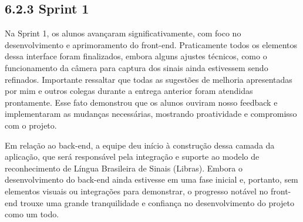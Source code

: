 \hypertarget{__RefHeading___Toc4470_311817663321}{}

\subsection*{6.2.3 Sprint 1}
\label{cliente-hoortech:text-h-0029}

\originaltab{}Na Sprint 1, os alunos avançaram significativamente, com foco no desenvolvimento e aprimoramento do front-end. Praticamente todos os elementos dessa interface foram finalizados, embora alguns ajustes técnicos, como o funcionamento da câmera para captura dos sinais ainda estivessem sendo refinados. Importante ressaltar que todas as sugestões de melhoria apresentadas por mim e outros colegas durante a entrega anterior foram atendidas prontamente. Esse fato demonstrou que os alunos ouviram nosso feedback e implementaram as mudanças necessárias, mostrando proatividade e compromisso com o projeto.\originalspace{}\par

\originaltab{}Em relação ao back-end, a equipe deu início à construção dessa camada da aplicação, que será responsável pela integração e suporte ao modelo de reconhecimento de Língua Brasileira de Sinais (Libras). Embora o desenvolvimento do back-end ainda estivesse em uma fase inicial e, portanto, sem elementos visuais ou integrações para demonstrar, o progresso notável no front-end trouxe uma grande tranquilidade e confiança no desenvolvimento do projeto como um todo.\par

